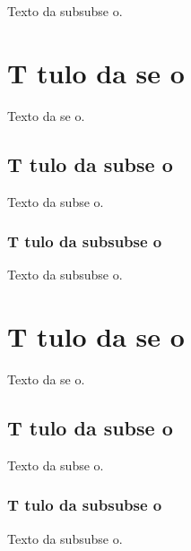 \documentclass{article}
\begin{document}
Texto da subsubse o.

\annex %


\section{T tulo da se o}

Texto da se o.

\subsection{T tulo da subse o}

Texto da subse o.

\subsubsection{T tulo da subsubse o}

Texto da subsubse o.


\section{T tulo da se o}

Texto da se o.

\subsection{T tulo da subse o}

Texto da subse o.

\subsubsection{T tulo da subsubse o}

Texto da subsubse o.

\end{document}
